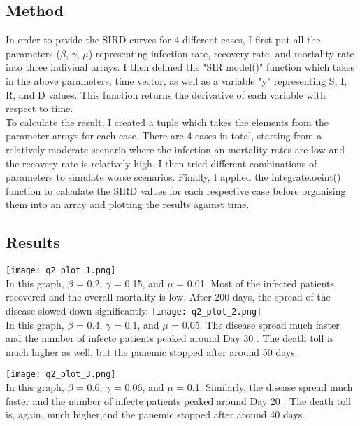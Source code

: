 \documentclass{article}
\begin{document}
\subsection*{Method}
In order to prvide the SIRD curves for 4 different cases, I first put all the parameters ($\beta$, $\gamma$, $\mu$) representing infection rate, recovery rate, and mortality rate into three indiviual arrays. I then defined the "SIR model()" function which takes in the above parameters, time vector, as well as a variable "y" representing S, I, R, and D values. This function returns the derivative of each variable with respect to time.
 \\
To calculate the result, I created a tuple which takes the elements from the parameter arrays for each case. There are 4 cases in total, starting from a relatively moderate scenario where the infection an mortality rates are low and the recovery rate is relatively high. I then tried different combinations of parameters to simulate worse scenarios. Finally, I applied the integrate.oeint() function to calculate the SIRD values for each respective case before organising them into an array and plotting the results against time.

\subsection*{Results}
\texttt{[image: q2\_plot\_1.png]}
 \\
In this graph, $\beta$ = 0.2, $\gamma$ = 0.15, and $\mu$ = 0.01. Most of the infected patients recovered and the overall mortality is low. After 200 days, the spread of the disease slowed down significantly.
\newpage
\texttt{[image: q2\_plot\_2.png]}
 \\
In this graph, $\beta$ = 0.4, $\gamma$ = 0.1, and $\mu$ = 0.05. The disease spread much faster and the number of infecte patients peaked around Day 30 . The death toll is much higher as well, but the panemic stopped after around 50 days.


\texttt{[image: q2\_plot\_3.png]}
 \\
In this graph, $\beta$ = 0.6, $\gamma$ = 0.06, and $\mu$ = 0.1. Similarly, the disease spread much faster and the number of infecte patients peaked around Day 20 . The death toll is, again, much higher,and the panemic stopped after around 40 days.
\end{document}

